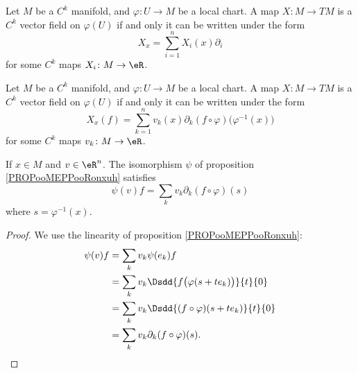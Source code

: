 \begin{proposition}		\label{PROPooXURIooYPytwa}
	Let \( M\) be a \( C^k\) manifold, and \( \varphi\colon U\to M\) be a local chart. A map \( X\colon M\to TM\) is a \( C^k\) vector field on \( \varphi(U)\) if and only it can be written under the form
	\begin{equation}
		X_x=\sum_{i=1}^nX_i(x)\partial_i
	\end{equation}
	for some \( C^k\) maps \( X_i\colon M\to \eR\).
\end{proposition}

\begin{lemma}        \label{LEMooZWFAooDlYaJm}
	Let \( M\) be a \( C^k\) manifold, and \( \varphi\colon U\to M\) be a local chart. A map \( X\colon M\to TM\) is a \( C^k\) vector field on \( \varphi(U)\) if and only it can be written under the form
	\begin{equation}
		X_x(f)=\sum_{k=1}^nv_k(x)\partial_k(f\circ\varphi)\big( \varphi^{-1}(x) \big)
	\end{equation}
	for some \( C^k\) maps \( v_k\colon M\to \eR\).
\end{lemma}

\begin{lemma}       \label{LEMooIQZWooOSLNXB}
	If \( x\in M\) and \( v\in \eR^n\). The isomorphism \( \psi\) of proposition \ref{PROPooMEPPooRonxuh} satisfies
	\begin{equation}        \label{EQooBVOBooBTfYWC}
		\psi(v)f=\sum_kv_k\partial_k(f\circ\varphi)(s)
	\end{equation}
	where \( s=\varphi^{-1}(x)\).
\end{lemma}

\begin{proof}
	We use the linearity of proposition \ref{PROPooMEPPooRonxuh}:
	\begin{subequations}
		\begin{align}
			\psi(v)f & =\sum_kv_k\psi(e_k)f                                  \\
			         & =\sum_kv_k\Dsdd{ f\big( \varphi(s+te_k) \big) }{t}{0} \\
			         & =\sum_kv_k\Dsdd{ (f\circ\varphi)(s+te_k) }{t}{0}      \\
			         & =\sum_kv_k\partial_k(f\circ\varphi)(s).
		\end{align}
	\end{subequations}
\end{proof}



